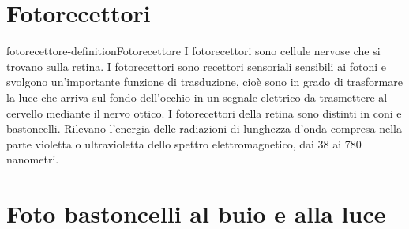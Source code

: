 \documentclass[preview]{standalone}
\begin{document}
\section{Fotorecettori}

\begin{snippetdefinition}{fotorecettore-definition}{Fotorecettore}
    I fotorecettori sono cellule nervose che si trovano sulla retina. I fotorecettori sono recettori
    sensoriali sensibili ai fotoni e svolgono un'importante funzione di trasduzione, cioè sono in
    grado di trasformare la luce che arriva sul fondo dell'occhio in un segnale elettrico da
    trasmettere al cervello mediante il nervo ottico. I fotorecettori della retina sono distinti in coni
    e bastoncelli. Rilevano l'energia delle radiazioni di lunghezza d'onda compresa nella parte
    violetta o ultravioletta dello spettro elettromagnetico, dai 38 ai 780 nanometri.
\end{snippetdefinition}





\section{Foto bastoncelli al buio e alla luce}
\end{document}
